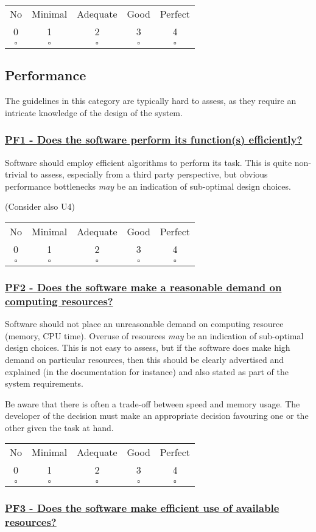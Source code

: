 \documentclass[a4paper,11pt]{article}
\newcommand{\criterion}[2]{\subsubsection*{\underline{#1 - #2}}\label{id:#1}}
\newcommand\CheckTable{%
  \begin{tabular}{ccccc}
    No & Minimal & Adequate & Good & Perfect \\
    0 & 1 & 2 & 3 & 4 \\
    \hline
    $\square$ & $\square$ & $\square$ & $\square$ & $\square$ \\
  \end{tabular}%
}
\begin{document}
\CheckTable

\subsection{Performance}\label{sec:per}

The guidelines in this category are typically hard to assess, as they require
an intricate knowledge of the design of the system. 

\newcommand{\pfOneID}{PF1}
\newcommand{\pfOneText}{Does the software perform its function(s) efficiently?}
\criterion{\pfOneID}{\pfOneText}

Software should employ efficient algorithms to perform its task. This is quite
non-trivial to assess, especially from a third party perspective, but obvious
performance bottlenecks \emph{may} be an indication of sub-optimal design
choices.

%
%
%
(Consider also U4)

\CheckTable

\newcommand{\pfTwoID}{PF2}
\newcommand{\pfTwoText}{Does the software make a reasonable demand on computing resources?}
\criterion{\pfTwoID}{\pfTwoText}

Software should not place an unreasonable demand on computing resource (memory,
CPU time). Overuse of resources \emph{may} be an indication of sub-optimal
design choices.  This is not easy to assess, but if the software does make high
demand on particular resources, then this should be clearly advertised and
explained (in the documentation for instance) and also stated as part of the
system requirements.

Be aware that there is often a trade-off between speed and memory usage. The
developer of the decision must make an appropriate decision favouring one or the other
given the task at hand. 

\CheckTable

\newcommand{\pfThreeID}{PF3}
\newcommand{\pfThreeText}{Does the software make efficient use of available resources?}
\criterion{\pfThreeID}{\pfThreeText}
\end{document}
